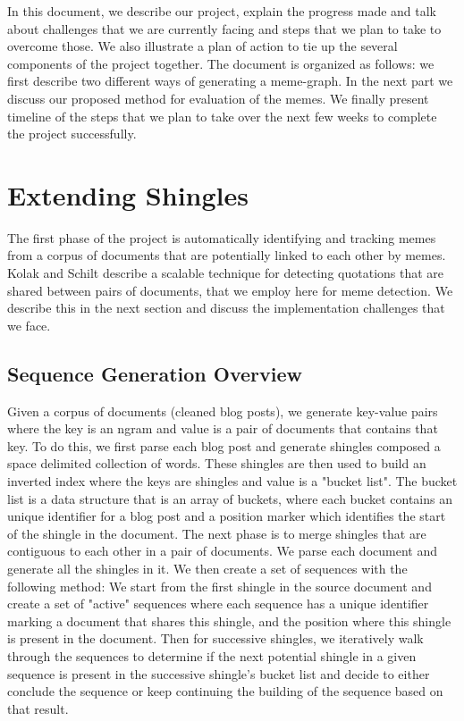 \documentclass{acm_proc_article-sp}
\begin{document}
In this document, we describe our project, explain the progress made and talk about challenges that we are currently facing and steps that we plan to take to overcome those. We also illustrate a plan of action to tie up the several components of the project together. The document is organized as follows: we first describe two different ways of generating a meme-graph. In the next part we discuss our proposed method for evaluation of the memes. We finally present timeline of the steps that we plan to take over the next few weeks to complete the project successfully. 


\section{Extending Shingles}
The first phase of the project is automatically identifying and tracking memes from a corpus of documents that are potentially linked to each other by memes. Kolak and Schilt \cite{kolak2008generating} describe a scalable technique for detecting quotations that are shared between pairs of documents, that we employ here for meme detection. We describe this in the next section and discuss the implementation challenges that we face.

\subsection{Sequence Generation Overview}
Given a corpus of documents (cleaned blog posts), we generate key-value pairs where the key is an ngram and value is a pair of documents that contains that key. To do this, we first parse each blog post and generate shingles composed a space delimited collection of words. These shingles are then used to build an inverted index where the keys are shingles and value is a "bucket list". The bucket list is a data structure that is an array of buckets, where each bucket contains an unique identifier for a blog post and a position marker which identifies the start of the shingle in the document. The next phase is to merge shingles that are contiguous to each other in a pair of documents. We parse each document and generate all the shingles in it. We then create a set of sequences with the following method: We start from the first shingle in the source document and create a set of "active" sequences where each sequence has a unique identifier marking a document that shares this shingle, and the position where this shingle is present in the document. Then for successive shingles, we iteratively walk through the sequences to determine if the next potential shingle in a given sequence is present in the successive shingle's bucket list and decide to either conclude the sequence or keep continuing the building of the sequence based on that result. 
\end{document}
